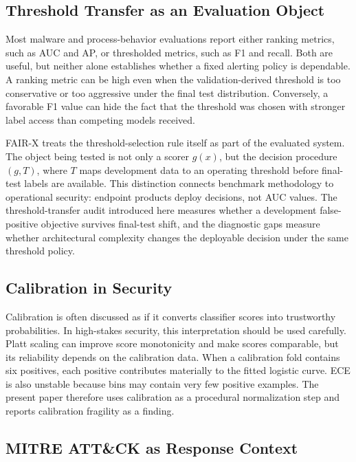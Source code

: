 \documentclass[10pt,journal,compsoc]{IEEEtran}
\begin{document}
\subsection{Threshold Transfer as an Evaluation Object}

Most malware and process-behavior evaluations report either ranking metrics, such as AUC and AP, or thresholded metrics, such as F1 and recall. Both are useful, but neither alone establishes whether a fixed alerting policy is dependable. A ranking metric can be high even when the validation-derived threshold is too conservative or too aggressive under the final test distribution. Conversely, a favorable F1 value can hide the fact that the threshold was chosen with stronger label access than competing models received.

FAIR-X treats the threshold-selection rule itself as part of the evaluated system. The object being tested is not only a scorer $g(x)$, but the decision procedure $(g,T)$, where $T$ maps development data to an operating threshold before final-test labels are available. This distinction connects benchmark methodology to operational security: endpoint products deploy decisions, not AUC values. The threshold-transfer audit introduced here measures whether a development false-positive objective survives final-test shift, and the diagnostic gaps measure whether architectural complexity changes the deployable decision under the same threshold policy.

\subsection{Calibration in Security}

Calibration is often discussed as if it converts classifier scores into trustworthy probabilities. In high-stakes security, this interpretation should be used carefully. Platt scaling can improve score monotonicity and make scores comparable, but its reliability depends on the calibration data. When a calibration fold contains six positives, each positive contributes materially to the fitted logistic curve. ECE is also unstable because bins may contain very few positive examples. The present paper therefore uses calibration as a procedural normalization step and reports calibration fragility as a finding.

\subsection{MITRE ATT\&CK as Response Context}
\end{document}
